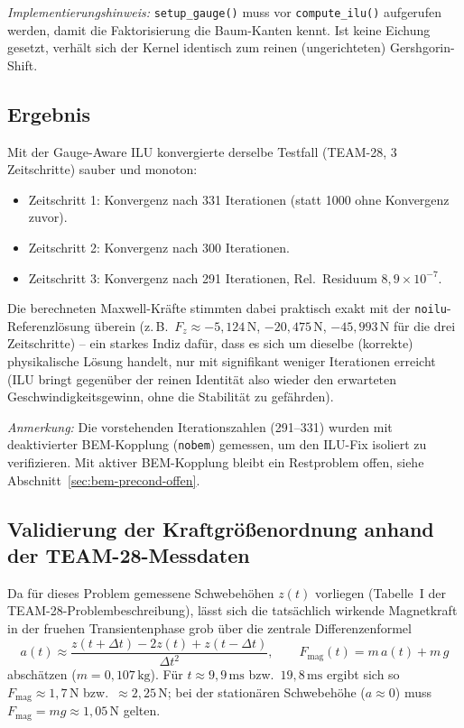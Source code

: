 \documentclass[11pt,a4paper]{article}
\begin{document}
\emph{Implementierungshinweis:} \texttt{setup\_gauge()} muss vor \texttt{compute\_ilu()} aufgerufen werden, damit die Faktorisierung die Baum-Kanten kennt. Ist keine Eichung gesetzt, verhält sich der Kernel identisch zum reinen (ungerichteten) Gershgorin-Shift.

\subsection{Ergebnis}

Mit der Gauge-Aware ILU konvergierte derselbe Testfall (TEAM-28, 3 Zeitschritte) sauber und monoton:
\begin{itemize}
    \item Zeitschritt 1: Konvergenz nach 331 Iterationen (statt 1000 ohne Konvergenz zuvor).
    \item Zeitschritt 2: Konvergenz nach 300 Iterationen.
    \item Zeitschritt 3: Konvergenz nach 291 Iterationen, Rel.\ Residuum $8{,}9\times 10^{-7}$.
\end{itemize}
Die berechneten Maxwell-Kräfte stimmten dabei praktisch exakt mit der \texttt{noilu}-Referenzlösung überein (z.\,B.\ $F_z \approx -5{,}124\,\mathrm{N}$, $-20{,}475\,\mathrm{N}$, $-45{,}993\,\mathrm{N}$ für die drei Zeitschritte) -- ein starkes Indiz dafür, dass es sich um dieselbe (korrekte) physikalische Lösung handelt, nur mit signifikant weniger Iterationen erreicht (ILU bringt gegenüber der reinen Identität also wieder den erwarteten Geschwindigkeitsgewinn, ohne die Stabilität zu gefährden).

\emph{Anmerkung:} Die vorstehenden Iterationszahlen (291--331) wurden mit deaktivierter BEM-Kopplung (\texttt{nobem}) gemessen, um den ILU-Fix isoliert zu verifizieren. Mit aktiver BEM-Kopplung bleibt ein Restproblem offen, siehe Abschnitt~\ref{sec:bem-precond-offen}.

\subsection{Validierung der Kraftgrößenordnung anhand der TEAM-28-Messdaten}

Da für dieses Problem gemessene Schwebehöhen $z(t)$ vorliegen (Tabelle~I der TEAM-28-Problembeschreibung), lässt sich die tatsächlich wirkende Magnetkraft in der fruehen Transientenphase grob über die zentrale Differenzenformel
\begin{equation}
    a(t) \approx \frac{z(t+\Delta t) - 2 z(t) + z(t-\Delta t)}{\Delta t^2}, \qquad F_{\text{mag}}(t) = m\,a(t) + m\,g
\end{equation}
abschätzen ($m = 0{,}107\,\mathrm{kg}$). Für $t \approx 9{,}9\,\mathrm{ms}$ bzw.\ $19{,}8\,\mathrm{ms}$ ergibt sich so $F_{\text{mag}} \approx 1{,}7\,\mathrm{N}$ bzw.\ $\approx 2{,}25\,\mathrm{N}$; bei der stationären Schwebehöhe ($a \approx 0$) muss $F_{\text{mag}} = m g \approx 1{,}05\,\mathrm{N}$ gelten.
\end{document}
